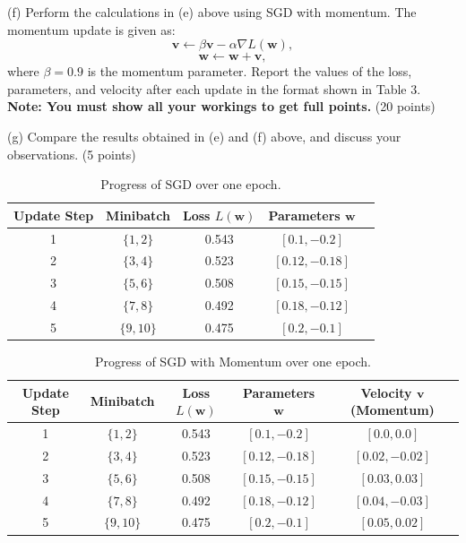 \documentclass[a3paper,12pt]{article} %
\begin{document}
(f)
Perform the calculations in (e) above using SGD with momentum. The momentum update is given as:
\[
\mathbf{v} \gets \beta \mathbf{v} - \alpha \nabla L(\mathbf{w}),
\]
\[
\mathbf{w} \gets \mathbf{w} + \mathbf{v},
\]
where $\beta = 0.9$ is the momentum parameter. Report the values of the loss, parameters, and velocity after each update in the format shown in Table 3. \textbf{Note: You must show all your workings to get full points.}
\hfill (20 points)

(g)
Compare the results obtained in (e) and (f) above, and discuss your observations.
\hfill (5 points)

\begin{table}[h!]
\centering
\begin{tabular}{|c|c|c|c|c|}
\hline
\textbf{Update Step} & \textbf{Minibatch} & \textbf{Loss $L(\mathbf{w})$} & \textbf{Parameters $\mathbf{w}$} \\ \hline
1 & $\{1, 2\}$ & 0.543 & $[0.1, -0.2]$ \\ \hline
2 & $\{3, 4\}$ & 0.523 & $[0.12, -0.18]$ \\ \hline
3 & $\{5, 6\}$ & 0.508 & $[0.15, -0.15]$ \\ \hline
4 & $\{7, 8\}$ & 0.492 & $[0.18, -0.12]$ \\ \hline
5 & $\{9, 10\}$ & 0.475 & $[0.2, -0.1]$ \\ \hline
\end{tabular}
\caption{Progress of SGD over one epoch.}
\label{tab:table2}
\end{table}

\begin{table}[h!]
\centering
\begin{tabular}{|c|c|c|c|c|}
\hline
\textbf{Update Step} & \textbf{Minibatch} & \textbf{Loss $L(\mathbf{w})$} & \textbf{Parameters $\mathbf{w}$} & \textbf{Velocity $\mathbf{v}$ (Momentum)} \\ \hline
1 & $\{1, 2\}$ & 0.543 & $[0.1, -0.2]$ & $[0.0, 0.0]$ \\ \hline
2 & $\{3, 4\}$ & 0.523 & $[0.12, -0.18]$ & $[0.02, -0.02]$ \\ \hline
3 & $\{5, 6\}$ & 0.508 & $[0.15, -0.15]$ & $[0.03, 0.03]$ \\ \hline
4 & $\{7, 8\}$ & 0.492 & $[0.18, -0.12]$ & $[0.04, -0.03]$ \\ \hline
5 & $\{9, 10\}$ & 0.475 & $[0.2, -0.1]$ & $[0.05, 0.02]$ \\ \hline
\end{tabular}
\caption{Progress of SGD with Momentum over one epoch.}
\label{tab:table2}
\end{table}
\end{document}
